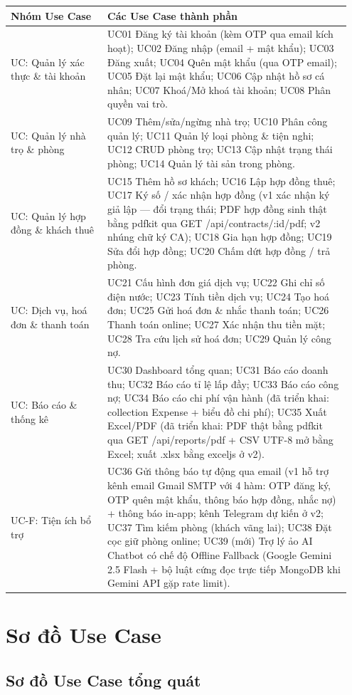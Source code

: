 \documentclass[a4paper,oneside]{report}
\begin{document}
\begin{longtable}[]{@{}>{\RaggedRight\arraybackslash}p{0.27\linewidth}>{\RaggedRight\arraybackslash}p{0.68\linewidth}@{}}
\toprule
\textbf{Nhóm Use Case} & \textbf{Các Use Case thành phần}\tabularnewline
\midrule
\endhead
UC: Quản lý xác thực \& tài khoản & UC01 Đăng ký tài khoản (kèm OTP qua
email kích hoạt); UC02 Đăng nhập (email + mật khẩu); UC03 Đăng xuất;
UC04 Quên mật khẩu (qua OTP email); UC05 Đặt lại mật khẩu; UC06 Cập nhật
hồ sơ cá nhân; UC07 Khoá/Mở khoá tài khoản; UC08 Phân quyền vai
trò.\tabularnewline
UC: Quản lý nhà trọ \& phòng & UC09 Thêm/sửa/ngừng nhà trọ; UC10 Phân
công quản lý; UC11 Quản lý loại phòng \& tiện nghi; UC12 CRUD phòng trọ;
UC13 Cập nhật trạng thái phòng; UC14 Quản lý tài sản trong
phòng.\tabularnewline
UC: Quản lý hợp đồng \& khách thuê & UC15 Thêm hồ sơ khách; UC16 Lập hợp
đồng thuê; UC17 Ký số / xác nhận hợp đồng (v1 xác nhận ký giả lập ---
đổi trạng thái; PDF hợp đồng sinh thật bằng pdfkit qua GET
/api/contracts/:id/pdf; v2 nhúng chữ ký CA); UC18 Gia hạn hợp đồng; UC19
Sửa đổi hợp đồng; UC20 Chấm dứt hợp đồng / trả phòng.\tabularnewline
UC: Dịch vụ, hoá đơn \& thanh toán & UC21 Cấu hình đơn giá dịch vụ; UC22
Ghi chỉ số điện nước; UC23 Tính tiền dịch vụ; UC24 Tạo hoá đơn; UC25 Gửi
hoá đơn \& nhắc thanh toán; UC26 Thanh toán online; UC27 Xác nhận thu
tiền mặt; UC28 Tra cứu lịch sử hoá đơn; UC29 Quản lý công
nợ.\tabularnewline
UC: Báo cáo \& thống kê & UC30 Dashboard tổng quan; UC31 Báo cáo doanh
thu; UC32 Báo cáo tỉ lệ lấp đầy; UC33 Báo cáo công nợ; UC34 Báo cáo chi
phí vận hành (đã triển khai: collection Expense + biểu đồ chi phí); UC35
Xuất Excel/PDF (đã triển khai: PDF thật bằng pdfkit qua GET
/api/reports/pdf + CSV UTF-8 mở bằng Excel; xuất .xlsx bằng exceljs ở
v2).\tabularnewline
UC-F: Tiện ích bổ trợ & UC36 Gửi thông báo tự động qua email (v1 hỗ trợ
kênh email Gmail SMTP với 4 hàm: OTP đăng ký, OTP quên mật khẩu, thông
báo hợp đồng, nhắc nợ) + thông báo in-app; kênh Telegram dự kiến ở v2;
UC37 Tìm kiếm phòng (khách vãng lai); UC38 Đặt cọc giữ phòng online;
UC39 (mới) Trợ lý ảo AI Chatbot có chế độ Offline Fallback (Google
Gemini 2.5 Flash + bộ luật cứng đọc trực tiếp MongoDB khi Gemini API gặp
rate limit).\tabularnewline
\bottomrule
\end{longtable}

\section{Sơ đồ Use Case}

\subsection{Sơ đồ Use Case tổng quát}
\end{document}
